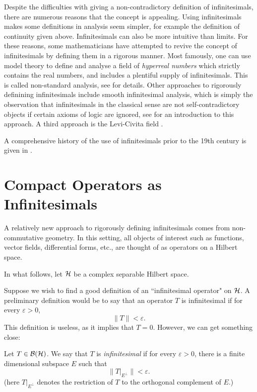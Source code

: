 Despite the difficulties with giving a non-contradictory definition
of infinitesimals, there are numerous reasons that the concept is appealing. 
Using infinitesimals makes some definitions in analysis seem simpler, for example
the definition of continuity given above. Infinitesimals
can also be more intuitive than limits. For these reasons, some mathematicians
have attempted to revive the concept of infinitesimals
by defining them in a rigorous manner. Most famously, one can 
use model theory to define and analyse a field of \emph{hyperreal numbers}
which strictly contains the real numbers, and includes a plentiful supply of infinitesimals.
This is called non-standard analysis, see \cite{robinson} for details.
Other approaches to rigorously definining infinitesimals include smooth infinitesimal
analysis, which is simply the observation that infinitesimals in the classical
sense are not self-contradictory objects if certain axioms of logic are ignored, see
\cite{sia} for an introduction to this approach.
A third approach is the Levi-Civita field \cite{lcf}.

A comprehensive history of the use of infinitesimals prior to the 19th
century is given in \cite{infinitesimalBook}.

\section{Compact Operators as Infinitesimals}
A relatively new approach to rigorously defining infinitesimals
comes from non-commutative geometry. In this setting, all objects
of interest such as functions, vector fields, differential forms, etc., are
thought of as operators on a Hilbert space. 

In what follows, let $\mathcal{H}$ be a complex separable Hilbert space. 

Suppose we wish to find a good definition
of an ``infinitesimal operator" on $\mathcal{H}$. A preliminary definition
would be to say that an operator $T$ is infinitesimal if for every $\varepsilon > 0$, 
\begin{equation}
    \|T\| < \varepsilon.
\end{equation}  
This definition is useless, as it implies that $T = 0$. However, we can get something close:
\begin{definition}
\label{infinitesimal}
    Let $T \in \mathcal{B}(\mathcal{H})$. We say that $T$ is \emph{infinitesimal}
    if for every $\varepsilon > 0$, there is a finite dimensional
    subspace $E$ such that
    \begin{equation}
        \|T|_{E^\perp}\| < \varepsilon.
    \end{equation}
    (here $T|_{E^\perp}$ denotes the restriction of $T$ to the orthogonal complement of $E$.)
\end{definition}


